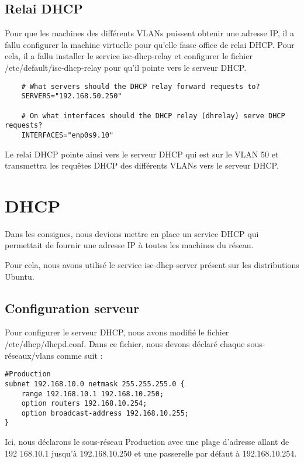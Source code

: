 \documentclass[a4paper,12pt]{report}
\begin{document}
            \subsection{Relai DHCP}

            Pour que les machines des différents VLANs puissent obtenir une adresse IP, il a fallu configurer la machine virtuelle pour qu'elle fasse office de relai DHCP. Pour cela, il a fallu installer le service isc-dhcp-relay et configurer le fichier /etc/default/isc-dhcp-relay pour qu'il pointe vers le serveur DHCP.

            \begin{verbatim}
    # What servers should the DHCP relay forward requests to?
    SERVERS="192.168.50.250"
    
    # On what interfaces should the DHCP relay (dhrelay) serve DHCP requests?
    INTERFACES="enp0s9.10"
            \end{verbatim}
            Le relai DHCP pointe ainsi vers le serveur DHCP qui est sur le VLAN 50 et transmettra les requêtes DHCP des différents VLANs vers le serveur DHCP.
        \section{DHCP}
            Dans les consignes, nous devions mettre en place un service DHCP qui permettait de fournir une adresse IP à toutes les machines du réseau. 
            
            Pour cela, nous avons utilisé le service isc-dhcp-server présent sur les distributions Ubuntu.
            \subsection{Configuration serveur}
                Pour configurer le serveur DHCP, nous avons modifié le fichier /etc/dhcp/dhcpd.conf. 
                Dans ce fichier, nous devons déclaré chaque sous-réseaux/vlans comme suit :
                
                    \begin{verbatim}
#Production
subnet 192.168.10.0 netmask 255.255.255.0 {
    range 192.168.10.1 192.168.10.250;
    option routers 192.168.10.254;
    option broadcast-address 192.168.10.255;
}
                    \end{verbatim}
                
                Ici, nous déclarons le sous-réseau Production avec une plage d'adresse allant de 192
                168.10.1 jusqu'à 192.168.10.250 et une passerelle par défaut à 192.168.10.254.
\end{document}

